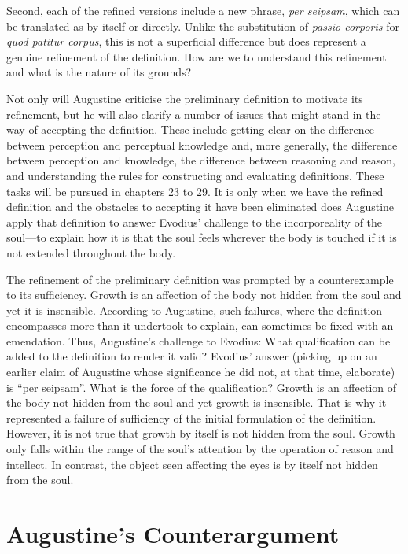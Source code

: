 \documentclass[12pt]{article}
\begin{document}
Second, each of the refined versions include a new phrase, \emph{per seipsam}, which can be translated as by itself or directly. Unlike the substitution of \emph{passio corporis} for \emph{quod patitur corpus}, this is not a superficial difference but does represent a genuine refinement of the definition. How are we to understand this refinement and what is the nature of its grounds?

Not only will Augustine criticise the preliminary definition to motivate its refinement, but he will also clarify a number of issues that might stand in the way of accepting the definition. These include getting clear on the difference between perception and perceptual knowledge and, more generally, the difference between perception and knowledge, the difference between reasoning and reason, and understanding the rules for constructing and evaluating definitions. These tasks will be pursued in chapters 23 to 29. It is only when we have the refined definition and the obstacles to accepting it have been eliminated does Augustine apply that definition to answer Evodius' challenge to the incorporeality of the soul---to explain how it is that the soul feels wherever the body is touched if it is not extended throughout the body.

The refinement of the preliminary definition was prompted by a counterexample to its sufficiency. Growth is an affection of the body not hidden from the soul and yet it is insensible. According to Augustine, such failures, where the definition encompasses more than it undertook to explain, can sometimes be fixed with an emendation. Thus, Augustine's challenge to Evodius: What qualification can be added to the definition to render it valid? Evodius' answer (picking up on an earlier claim of Augustine whose significance he did not, at that time, elaborate) is ``per seipsam''. What is the force of the qualification? Growth is an affection of the body not hidden from the soul and yet growth is insensible. That is why it represented a failure of sufficiency of the initial formulation of the definition. However, it is not true that growth by itself is not hidden from the soul. Growth only falls within the range of the soul's attention by the operation of reason and intellect. In contrast, the object seen affecting the eyes is by itself not hidden from the soul.


\section{Augustine's Counterargument} %
\label{sec:augustine_s_counterargument}
\end{document}

